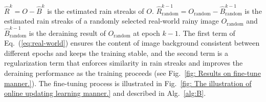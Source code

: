 \documentclass[letterpaper]{article} %
\begin{document}
$\hat{R}^{k}= O-\hat{B}^{k}$ is the estimated rain streaks of $O$. $\hat{R}^{k-1}_{\text{random}} = O_{\text{random}}-\hat{B}_{\text{random}}^{k-1}$ is the estimated rain streaks of a randomly selected real-world rainy image $O_{\text{random}}$ and $\hat{B}_{\text{random}}^{k-1}$ is the deraining result of $O_{\text{random}}$ at epoch $k-1$.
The first term of Eq.~(\ref{eq:real-world}) ensures the content of image background consistent between different epochs and keeps the training stable, and the second term is a regularization term that enforces similarity in rain streaks and improves the deraining performance as the training proceeds (see Fig.~\ref{fig: Results on fine-tune manner.}).
%
The fine-tuning process is illustrated in
Fig.~\ref{fig: The illustration of online updating learning manner.} and described in Alg.~\ref{alg:B}.
%
%
\end{document}
